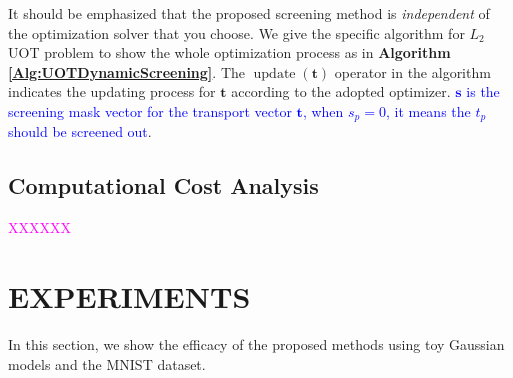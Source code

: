 \documentclass[twoside]{article}
\theoremstyle{plain}
\renewcommand{\vec}[1]{\bm{#1}}
\newcommand{\changeXS}[1]{\textcolor{blue}{#1}}
\newcommand{\note}[1]{\textcolor{magenta}{#1}}
\begin{document}
It should be emphasized that the proposed screening method is {\it independent} of the optimization solver that you choose. We give the specific algorithm for $L_2$ UOT problem to show the whole optimization process as in {\bf Algorithm \ref{Alg:UOTDynamicScreening}}. The $\operatorname{update}(\vec{t})$ operator in the algorithm indicates the updating process for $\vec{t}$ according to the adopted optimizer. \changeXS{$\vec s$ is the screening mask vector for the transport vector $\vec t$, when $s_p = 0$, it means the $t_p$ should be screened out}.\\

\subsection{Computational Cost Analysis}
\note{XXXXXX}

\section{EXPERIMENTS}
\label{sec:exp}
In this section, we show the efficacy of the proposed methods using toy Gaussian models and the MNIST dataset.
\end{document}
